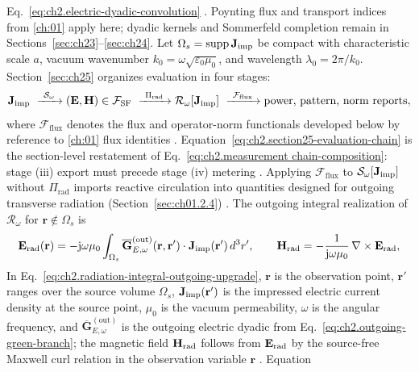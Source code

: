 Eq.~\eqref{eq:ch2.electric-dyadic-convolution} \cite{stratton1941}. Poynting flux and
transport indices from \ref{ch:01} apply here; dyadic kernels and
Sommerfeld completion remain in Sections~\ref{sec:ch23}--\ref{sec:ch24}.
Let \(\Omega_s=\operatorname{supp}\mathbf{J}_{\mathrm{imp}}\) be compact with characteristic scale \(a\),
vacuum wavenumber \(k_0=\omega\sqrt{\varepsilon_0\mu_0}\), and wavelength
\(\lambda_0=2\pi/k_0\). Section~\ref{sec:ch25} organizes evaluation in four stages:
\begin{equation}
\label{eq:ch2.section25-evaluation-chain}
\mathbf{J}_{\mathrm{imp}}
\ \xrightarrow{\ \mathcal{S}_\omega\ }
(\mathbf{E},\mathbf{H})\in\mathcal{F}_{\mathrm{SF}}
\ \xrightarrow{\ \Pi_{\mathrm{rad}}\ }
\mathcal{R}_\omega[\mathbf{J}_{\mathrm{imp}}]
\ \xrightarrow{\ \mathcal{F}_{\mathrm{flux}}\ }
\text{power, pattern, norm reports},
\end{equation}
where \(\mathcal{F}_{\mathrm{flux}}\) denotes the flux and operator-norm functionals
developed below by reference to \ref{ch:01} flux identities
\cite{stratton1941}. Equation~\eqref{eq:ch2.section25-evaluation-chain} is the section-level
restatement of Eq.~\eqref{eq:ch2.measurement chain-composition}: stage (iii) export must precede
stage (iv) metering \cite{harrington2001}. Applying \(\mathcal{F}_{\mathrm{flux}}\) to
\(\mathcal{S}_\omega[\mathbf{J}_{\mathrm{imp}}]\) without \(\Pi_{\mathrm{rad}}\) imports reactive circulation
into quantities designed for outgoing transverse radiation
(Section~\ref{sec:ch01.2.4}) \cite{stratton1941}.
The outgoing integral realization of \(\mathcal{R}_\omega\) for
\(\mathbf{r}\notin\Omega_s\) is
\begin{equation}
\label{eq:ch2.radiation-integral-outgoing-upgrade}
\mathbf{E}_{\mathrm{rad}}(\mathbf{r})
=
-\mathrm{j}\omega\mu_0
\int_{\Omega_s}
\overline{\mathbf{G}}_{E,\omega}^{\mathrm{(out)}}(\mathbf{r},\mathbf{r}')\cdot\mathbf{J}_{\mathrm{imp}}(\mathbf{r}')\,d^{3}r',
\qquad
\mathbf{H}_{\mathrm{rad}}
=
-\frac{1}{\mathrm{j}\omega\mu_0}\,\nabla\times\mathbf{E}_{\mathrm{rad}},
\end{equation}
In Eq.~\eqref{eq:ch2.radiation-integral-outgoing-upgrade}, \(\mathbf{r}\) is the observation
point, \(\mathbf{r}'\) ranges over the source volume \(\Omega_s\), \(\mathbf{J}_{\mathrm{imp}}(\mathbf{r}')\) is
the impressed electric current density at the source point, \(\mu_0\) is the vacuum permeability,
\(\omega\) is the angular frequency, and \(\overline{\mathbf{G}}_{E,\omega}^{\mathrm{(out)}}\)
is the outgoing electric dyadic from Eq.~\eqref{eq:ch2.outgoing-green-branch}; the magnetic
field \(\mathbf{H}_{\mathrm{rad}}\) follows from \(\mathbf{E}_{\mathrm{rad}}\) by the source-free Maxwell curl
relation in the observation variable \(\mathbf{r}\) \cite{stratton1941}. Equation
